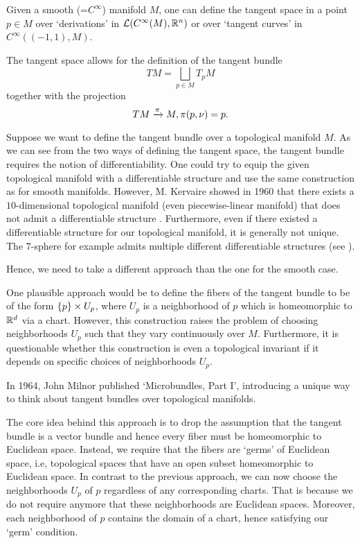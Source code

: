 \begin{myparagraph} Given a smooth (=$C^\infty$) manifold $M$, one can define the tangent space in a point $p \in M$ over `derivations' in $\mathcal{L}(C^\infty(M), \mathbb{R}^n)$ or over `tangent curves' in $C^\infty((-1, 1), M)$.

The tangent space allows for the definition of the tangent bundle \[ TM = \bigsqcup_{p \in M} T_p M\] together with the projection \[ TM \xrightarrow{\pi} M, \pi(p, \nu) = p. \]

Suppose we want to define the tangent bundle over a topological manifold $M$. As we can see from the two ways of defining the tangent space, the tangent bundle requires the notion of differentiability. One could try to equip the given topological manifold with a differentiable structure and use the same construction as for smooth manifolds. However, M. Kervaire showed in 1960 that there exists a $10$-dimensional topological manifold (even piecewise-linear manifold) that does not admit a differentiable structure \cite{kervaire}. Furthermore, even if there existed a differentiable structure for our topological manifold, it is generally not unique. The $7$-sphere for example admits multiple different differentiable structures (see \cite{milnor7sphere}).

Hence, we need to take a different approach than the one for the smooth case.

One plausible approach would be to define the fibers of the tangent bundle to be of the form $\{p\} \times U_p$, where $U_p$ is a neighborhood of $p$ which is homeomorphic to $\mathbb{R}^d$ via a chart. However, this construction raises the problem of choosing neighborhoods $U_p$ such that they vary continuously over $M$. Furthermore, it is questionable whether this construction is even a topological invariant if it depends on specific choices of neighborhoods $U_p$.

In 1964, John Milnor published `Microbundles, Part I', introducing a unique way to think about tangent bundles over topological manifolds.

The core idea behind this approach is to drop the assumption that the tangent bundle is a vector bundle and hence every fiber must be homeomorphic to Euclidean space. Instead, we require that the fibers are `germs' of Euclidean space, i.e, topological spaces that have an open subset homeomorphic to Euclidean space. In contrast to the previous approach, we can now choose the neighborhoods $U_p$ of $p$ regardless of any corresponding charts. That is because we do not require anymore that these neighborhoods are Euclidean spaces. Moreover, each neighborhood of $p$ contains the domain of a chart, hence satisfying our `germ' condition.


\end{myparagraph}
